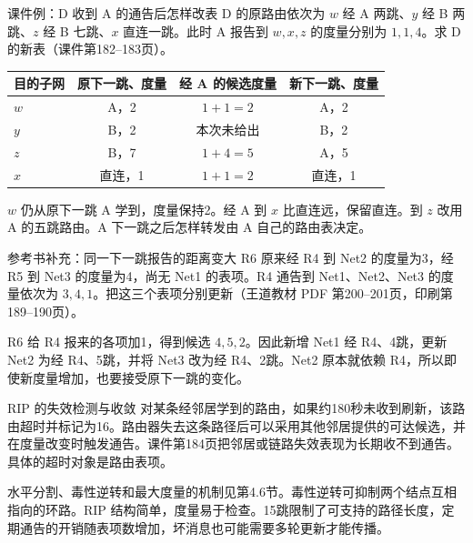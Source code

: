 \begin{example}{课件例：D 收到 A 的通告后怎样改表}
D 的原路由依次为 $w$ 经 A 两跳、$y$ 经 B 两跳、$z$ 经 B 七跳、$x$ 直连一跳。此时 A 报告到 $w,x,z$ 的度量分别为 $1,1,4$。求 D 的新表（课件第182--183页）。
\end{example}
\begin{solution}
\begin{center}\small\setlength{\tabcolsep}{4pt}
\begin{tabular}{lccc}
  \toprule
  目的子网 & 原下一跳、度量 & 经 A 的候选度量 & 新下一跳、度量\\\midrule
  $w$ & A，2 & $1+1=2$ & A，2\\
  $y$ & B，2 & 本次未给出 & B，2\\
  $z$ & B，7 & $1+4=5$ & A，5\\
  $x$ & 直连，1 & $1+1=2$ & 直连，1\\\bottomrule
\end{tabular}
\end{center}
$w$ 仍从原下一跳 A 学到，度量保持2。经 A 到 $x$ 比直连远，保留直连。到 $z$ 改用 A 的五跳路由。A 下一跳之后怎样转发由 A 自己的路由表决定。
\end{solution}

\begin{example}{参考书补充：同一下一跳报告的距离变大}
R6 原来经 R4 到 Net2 的度量为3，经 R5 到 Net3 的度量为4，尚无 Net1 的表项。R4 通告到 Net1、Net2、Net3 的度量依次为 $3,4,1$。把这三个表项分别更新（王道教材 PDF 第200--201页，印刷第189--190页）。
\end{example}
\begin{solution}
R6 给 R4 报来的各项加1，得到候选 $4,5,2$。因此新增 Net1 经 R4、4跳，更新 Net2 为经 R4、5跳，并将 Net3 改为经 R4、2跳。Net2 原本就依赖 R4，所以即使新度量增加，也要接受原下一跳的变化。
\end{solution}

\begin{proposition}{RIP 的失效检测与收敛}
对某条经邻居学到的路由，如果约180秒未收到刷新，该路由超时并标记为16。路由器失去这条路径后可以采用其他邻居提供的可达候选，并在度量改变时触发通告。课件第184页把邻居或链路失效表现为长期收不到通告。具体的超时对象是路由表项。

水平分割、毒性逆转和最大度量的机制见第4.6节。毒性逆转可抑制两个结点互相指向的环路。RIP 结构简单，度量易于检查。15跳限制了可支持的路径长度，定期通告的开销随表项数增加，坏消息也可能需要多轮更新才能传播。
\end{proposition}
\par\noindent\parbox{\linewidth}{\annotationarea[4]}\par

